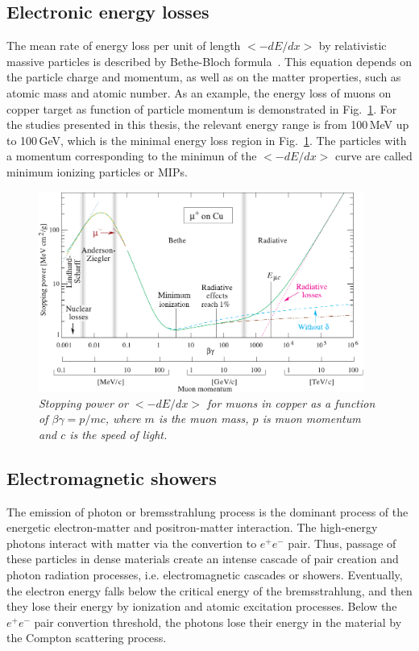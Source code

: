 \subsection{Electronic energy losses} 
The mean rate of energy loss per unit of length $<-dE/dx>$ by relativistic massive particles is described by Bethe-Bloch formula~\cite{bib:PDG}. 
This equation depends on the particle charge and momentum, as well as on the matter properties, such as atomic mass and atomic number. 
As an example, the energy loss of muons on copper target as function of particle momentum is demonstrated in Fig.~\ref{fig:BB_2}.
For the studies presented in this thesis, the relevant energy range is from 100\,MeV up to 100\,GeV, which is the minimal energy loss region in Fig.~\ref{fig:BB_2}.
The particles with a momentum corresponding to the minimun of the  $<-dE/dx>$ curve are called minimum ionizing particles or MIPs. 
\begin{figure}
	\centering
	\includegraphics[width=0.95\textwidth]{ECAL/graphics/rpp_icru49_cu.pdf}
	\caption{\label{fig:BB_2} \sl Stopping power or $<-dE/dx>$  for muons in copper as a function of $\beta\gamma = p/mc$, where $m$ is the muon mass, $p$ is muon momentum and $c$ is the speed of light. }
\end{figure}
\subsection{Electromagnetic showers}
The emission of photon or bremsstrahlung process is the dominant process of the energetic electron-matter and positron-matter interaction.
The high-energy photons interact with matter via the convertion to $e^+e^-$ pair.
Thus, passage of these particles in dense materials create an intense cascade of pair creation and photon radiation processes, i.e. electromagnetic cascades or showers.
Eventually, the electron energy falls below the critical energy of the bremsstrahlung, and then they lose their energy by ionization and atomic excitation processes.
Below the $e^+e^-$ pair convertion threshold, the photons lose their energy in the material by the Compton scattering process. 


